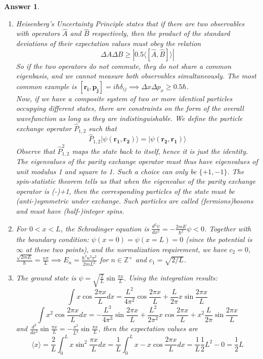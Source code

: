 \documentclass[a4paper]{article}
\newtheorem{ans}{Answer}[subsection]
\theoremstyle{new}
\begin{document}
\begin{ans}\leavevmode
\begin{enumerate}[label=(\roman*)]
\item Heisenberg's Uncertainty Principle states that if there are two observables with operators $\hat{A}$ and $\hat{B}$ respectively, then the product of the standard deviations of their expectation values must obey the relation
$$\Delta A\Delta B\geq|0.5\langle[\hat{A},\hat{B}]\rangle|$$
So if the two operators do not commute, they do not share a common eigenbasis, and we cannot measure both observables simultaneously. The most common example is $[\mathbf{r_i},\mathbf{p_j}]=i\hbar\delta_{ij}\implies\Delta x\Delta p_x\geq0.5\hbar$.\\[5pt]
Now, if we have a composite system of two or more identical particles occupying different states, there are constraints on the form of the overall wavefunction as long as they are indistinguishable. We define the particle exchange operator $\hat{P}_{1,2}$ such that
$$\hat{P}_{1,2}|\psi(\mathbf{r_1},\mathbf{r_2})\rangle=|\psi(\mathbf{r_2},\mathbf{r_1})\rangle$$
Observe that $\hat{P}_{1,2}^2$ maps the state back to itself, hence it is just the identity. The eigenvalues of the parity exchange operator must thus have eigenvalues of unit modulus 1 and square to 1. Such a choice can only be $\{+1,-1\}$. The spin-statistic theorem tells us that when the eigenvalue of the parity exchange operator is (-)+1, then the corresponding particles of the state must be (anti-)symmetric under exchange. Such particles are called (fermions)bosons and must have (half-)integer spins.
\item For $0<x<L$, the Schrodinger equation is $\frac{d^2\psi}{dx^2}=-\frac{2mE}{\hbar^2}\psi<0$. Together with the boundary condition: $\psi(x=0)=\psi(x=L)=0$ (since the potential is $\infty$ at these two points), and the normalization requirement, we have $c_2=0$, $\frac{\sqrt{2mE}}{\hbar}=\frac{n\pi}{L}\implies E_n=\frac{\hbar^2n^2\pi^2}{2mL^2}$ for $n\in\mathbb{Z}^+$ and $c_1=\sqrt{2/L}$. 
\item The ground state is $\psi=\sqrt{\frac{2}{L}}\sin\frac{\pi x}{L}$. Using the integration results:
$$\int x\cos\frac{2\pi x}{L}dx=\frac{L^2}{4\pi^2}\cos\frac{2\pi x}{L}+\frac{L}{2\pi}x\sin\frac{2\pi x}{L}$$
$$\int x^2\cos\frac{2\pi x}{L}dx=-\frac{L^3}{4\pi^3}\sin\frac{2\pi x}{L}+\frac{L^2}{2\pi^2}x\cos\frac{2\pi x}{L}+x^2\frac{L}{2\pi}\sin\frac{2\pi x}{L}$$
and $\frac{d^2}{dx^2}\sin\frac{\pi x}{L}=-\frac{\pi^2}{L^2}\sin\frac{\pi x}{L}$, then the expectation values are
$$\langle x\rangle=\frac{2}{L}\int_0^Lx\sin^2\frac{\pi x}{L}dx=\frac{1}{L}\int_0^L x-x\cos\frac{2\pi x}{L}dx=\frac{1}{L}\frac{1}{2}L^2-0=\frac{1}{2}L$$

\end{enumerate}
\end{ans}
\end{document}
